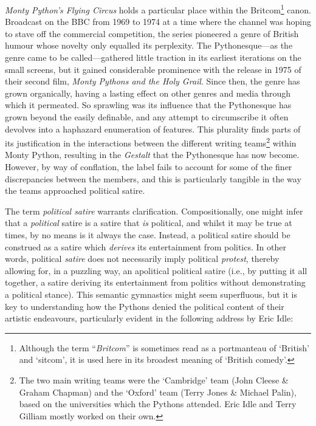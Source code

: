 \documentclass[
,a4paper
,DIV=12
,12pt
,abstract
,bibliography=totoc
]{scrartcl}
\begin{document}
\emph{Monty Python’s Flying Circus} holds a particular place within the Britcom\footnote{Although the term \enquote{\emph{Britcom}} is sometimes read as a portmanteau of ‘British’ and ‘sitcom’, it is used here in its broadest meaning of ‘British comedy’.} canon.  Broadcast on the BBC from 1969 to 1974 at a time where the channel was hoping to stave off the commercial competition, the series pioneered a genre of British humour whose novelty only equalled its perplexity.  The Pythonesque---as the genre came to be called---gathered little traction in its earliest iterations on the small screens, but it gained considerable prominence with the release in 1975 of their second film, \emph{Monty Pythons and the Holy Grail}.  Since then, the genre has grown organically, having a lasting effect on other genres and media through which it permeated.  So sprawling was its influence that the Pythonesque has grown beyond the easily definable, and any attempt to circumscribe it often devolves into a haphazard enumeration of features.  This plurality finds parts of its justification in the interactions between the different writing teams\footnote{The two main writing teams were the ‘Cambridge’ team (John Cleese \& Graham Chapman) and the ‘Oxford’ team (Terry Jones \& Michael Palin), based on the universities which the Pythons attended.  Eric Idle and Terry Gilliam mostly worked on their own.} within Monty Python, resulting in the \emph{Gestalt} that the Pythonesque has now become.  However, by way of conflation, the label fails to account for some of the finer discrepancies between the members, and this is particularly tangible in the way the teams approached political satire.

The term \emph{political satire} warrants clarification.  Compositionally, one might infer that a \emph{political} satire is a satire that \emph{is} political, and whilst it may be true at times, by no means is it always the case.  Instead, a political satire should be construed as a satire which \emph{derives} its entertainment from politics.  In other words, political \emph{satire} does not necessarily imply political \emph{protest}, thereby allowing for, in a puzzling way, an apolitical political satire (i.e., by putting it all together, a satire deriving its entertainment from politics without demonstrating a political stance).  This semantic gymnastics might seem superfluous, but it is key to understanding how the Pythons denied the political content of their artistic endeavours, particularly evident in the following address by Eric Idle:
\end{document}
